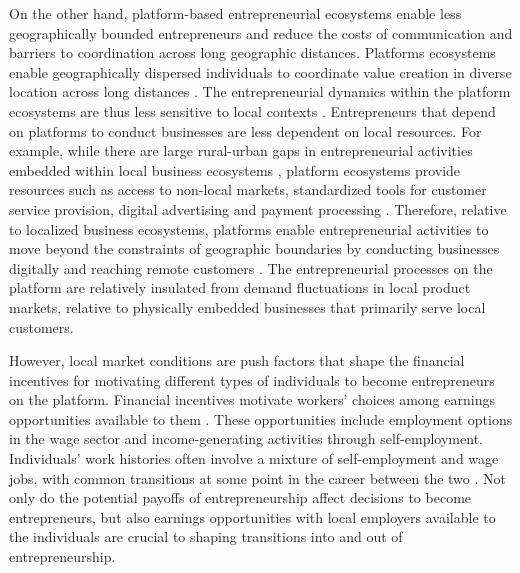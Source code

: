 \documentclass[letterpaper,12pt]{article}
\begin{document}
On the other hand, platform-based entrepreneurial ecosystems enable less geographically bounded entrepreneurs and reduce the costs of communication and barriers to coordination across long geographic distances. Platforms ecosystems enable geographically dispersed individuals to coordinate value creation in diverse location across long distances \citep{cennamo_platform_2013,sussan_digital_2017,jacobides_towards_2018}. The entrepreneurial dynamics within the platform ecosystems are thus less sensitive to local contexts \citep{haveman_spatial_2014,autio_digital_2018}. Entrepreneurs that depend on platforms to conduct businesses are less dependent on local resources. For example, while there are large rural-urban gaps in entrepreneurial activities embedded within local business ecosystems \citep{braesemann_icts_2022}, platform ecosystems provide resources such as access to non-local markets, standardized tools for customer service provision, digital advertising and payment processing \citep{forman_how_2005,koo_platform_2021}. Therefore, relative to localized business ecosystems, platforms enable entrepreneurial activities to move beyond the constraints of geographic boundaries by conducting businesses digitally and reaching remote customers \citep{nambisan_digital_2017,autio_digital_2018}. The entrepreneurial processes on the platform are relatively insulated from demand fluctuations in local product markets, relative to physically embedded businesses that primarily serve local customers.
 


However, local market conditions are push factors that shape the financial incentives for motivating different types of individuals to become entrepreneurs on the platform. Financial incentives motivate workers’ choices among earnings opportunities available to them \citep{autio_entrepreneurial_2014,berkhout_entrepreneurship_2016,burton_careers_2016}. These opportunities include employment options in the wage sector and income-generating activities through self-employment. Individuals’ work histories often involve a mixture of self-employment and wage jobs, with common transitions at some point in the career between the two \citep{ferber_long-term_1998,folta_hybrid_2010,dillon_self-employment_2017,ganser-stickler_sitting_2022}. Not only do the potential payoffs of entrepreneurship affect decisions to become entrepreneurs, but also earnings opportunities with local employers available to the individuals are crucial to shaping transitions into and out of entrepreneurship.
\end{document}
